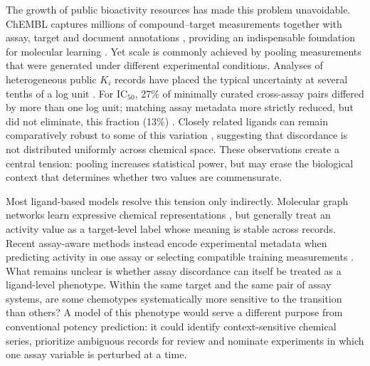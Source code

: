 \documentclass[letterpaper]{article}
\begin{document}
The growth of public bioactivity resources has made this problem unavoidable. ChEMBL captures millions of compound--target measurements together with assay, target and document annotations \citep{chembl2023,mendez2019chembl,papadatos2015curation}, providing an indispensable foundation for molecular learning \citep{wu2018moleculenet}. Yet scale is commonly achieved by pooling measurements that were generated under different experimental conditions. Analyses of heterogeneous public $K_i$ records have placed the typical uncertainty at several tenths of a log unit \citep{kramer2012uncertainty}. For IC$_{50}$, 27\% of minimally curated cross-assay pairs differed by more than one log unit; matching assay metadata more strictly reduced, but did not eliminate, this fraction (13\%) \citep{landrum2024noise}. Closely related ligands can remain comparatively robust to some of this variation \citep{nelen2025matched}, suggesting that discordance is not distributed uniformly across chemical space. These observations create a central tension: pooling increases statistical power, but may erase the biological context that determines whether two values are commensurate.

Most ligand-based models resolve this tension only indirectly. Molecular graph networks learn expressive chemical representations \citep{xu2019gin,hu2020strategies}, but generally treat an activity value as a target-level label whose meaning is stable across records. Recent assay-aware methods instead encode experimental metadata when predicting activity in one assay or selecting compatible training measurements \citep{schoenmaker2025context,assaymatch2026}. What remains unclear is whether assay discordance can itself be treated as a ligand-level phenotype. Within the same target and the same pair of assay systems, are some chemotypes systematically more sensitive to the transition than others? A model of this phenotype would serve a different purpose from conventional potency prediction: it could identify context-sensitive chemical series, prioritize ambiguous records for review and nominate experiments in which one assay variable is perturbed at a time.
\end{document}
